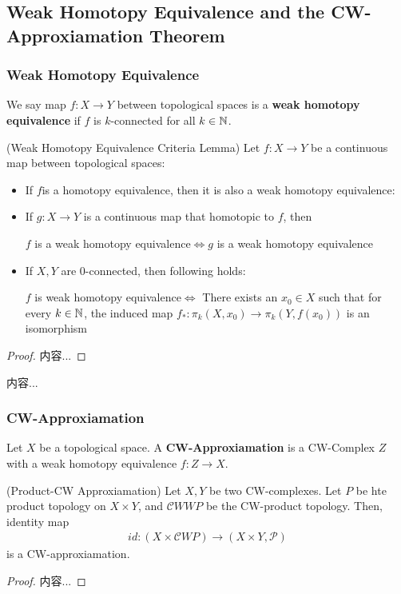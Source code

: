 \documentclass[Total.tex]{subfiles}
\begin{document}
	\subsection{Weak Homotopy Equivalence and the CW-Approxiamation Theorem}
		\subsubsection{Weak Homotopy Equivalence}
			\begin{Def}
				We say map $f:X\rightarrow Y$ between topological spaces is a \textbf{weak homotopy equivalence} if $f$ is $k$-connected for all $k\in \mathbb{N}$.
			\end{Def}
			\begin{lemma}
				(Weak Homotopy Equivalence Criteria Lemma) Let $f:X\rightarrow Y$ be a continuous map between topological spaces:
				\begin{itemize}
					\item If $f$is a homotopy equivalence, then it is also a weak homotopy equivalence:
					\item If $g:X\rightarrow Y$ is a continuous map that homotopic to $f$, then
					\begin{center}
						$f$ is a weak homotopy equivalence$\Leftrightarrow g$ is a weak homotopy equivalence
					\end{center}
					\item If $X,Y$ are $0$-connected, then following holds:
					\begin{center}
						$f$ is weak homotopy equivalence$\Leftrightarrow$ There exists an $x_0\in X$ such that for every $k\in \mathbb{N}$, the induced map $f_*:\pi_k(X,x_0)\rightarrow \pi_k(Y,f(x_0))$ is an isomorphism
					\end{center}
				\end{itemize}
			\end{lemma}
			\begin{proof}
				内容...
			\end{proof}
			\begin{proposition}
				内容...
			\end{proposition}
		\subsubsection{CW-Approxiamation}
			\begin{Def}
				Let $X$ be a topological space. A \textbf{CW-Approxiamation} is a CW-Complex $Z$ with a weak homotopy equivalence $f:Z\rightarrow X$.
			\end{Def}
			\begin{lemma}
				(Product-CW Approxiamation) Let $X,Y$ be two CW-complexes. Let $P$ be hte product topology on $X\times Y$, and ${\mathcal CWWP}$ be the CW-product topology. Then, identity map
				\begin{gather*}
					id:(X\times {\mathcal CWP})\rightarrow (X\times Y,\mathcal{P})
				\end{gather*}
				is a CW-approxiamation.
			\end{lemma}
			\begin{proof}
				内容...
			\end{proof}
			
\end{document}
